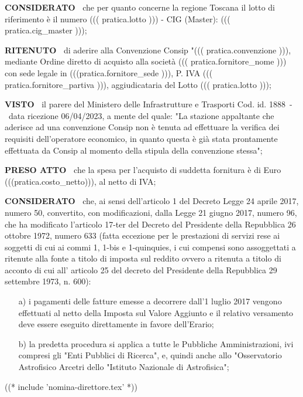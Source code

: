 \textbf{CONSIDERATO~} che per quanto concerne la regione Toscana il lotto di riferimento 
è il numero ((( pratica.lotto ))) - CIG (Master): ((( pratica.cig_master )));

\textbf{RITENUTO~} di aderire alla Convenzione Consip "((( pratica.convenzione ))),
 mediante Ordine diretto di acquisto alla società
((( pratica.fornitore_nome ))) con sede legale in (((pratica.fornitore_sede ))),
P. IVA ((( pratica.fornitore_partiva ))), aggiudicataria del Lotto ((( pratica.lotto )));

\textbf{VISTO~} il parere del Ministero delle Infrastrutture e Trasporti Cod. id.  
1888~-~data ricezione 06/04/2023, a mente del quale: "La stazione appaltante che 
aderisce ad una convenzione Consip non è tenuta ad effettuare la verifica dei
 requisiti dell’operatore economico, in quanto questa è già stata prontamente
 effettuata da Consip al momento della stipula della convenzione stessa";

\textbf{PRESO ATTO~} che la spesa per l'acquisto di suddetta fornitura è  di 
Euro (((pratica.costo_netto))), al netto di IVA; 

\textbf{CONSIDERATO~} che, ai sensi dell'articolo 1 del
Decreto Legge 24 aprile 2017, numero 50, convertito, con modificazioni,
dalla Legge 21 giugno 2017, numero 96, che ha modificato l'articolo
17-ter del Decreto del Presidente della Repubblica 26 ottobre 1972, numero
633 (fatta eccezione per le prestazioni di servizi rese ai soggetti di
cui ai commi 1, 1-bis e 1-quinquies, i cui compensi sono assoggettati a
ritenute alla fonte a titolo di imposta sul reddito ovvero a ritenuta a
titolo di acconto di cui all' articolo 25 del decreto del Presidente della
Repubblica 29 settembre 1973, n. 600):

\begin{enumerate}

\item[a)] i pagamenti delle fatture
emesse a decorrere dall'1 luglio 2017 vengono effettuati al netto della
Imposta sul Valore Aggiunto e il relativo versamento deve essere eseguito
direttamente in favore dell'Erario;

\item[b)] la predetta procedura si
applica a tutte le Pubbliche Amministrazioni, ivi compresi gli "Enti
Pubblici di Ricerca", e, quindi anche allo "Osservatorio Astrofisico
Arcetri dello "Istituto Nazionale di Astrofisica";
\end{enumerate}

((* include 'nomina-direttore.tex' *))

